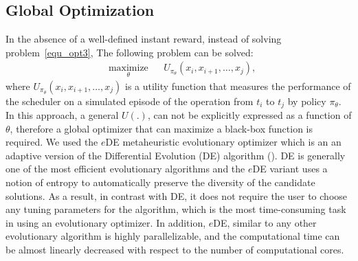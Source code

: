 \documentclass[11pt]{article}
\theoremstyle{definition}
\begin{document}
\subsection{Global Optimization}\label{sec_gopt}
In the absence of a well-defined instant reward, instead of solving problem~\ref{equ_opt3}, The following problem can be solved:
\begin{equation}%
\begin{aligned}
& \underset{\theta}{\text{maximize}}
& & U_{\pi_{\theta}}(x_i,x_{i+1}, \dots, x_{j}),
\end{aligned}
\end{equation}
where $U_{\pi_{\theta}}(x_i,x_{i+1}, \dots, x_{j})$ is a utility function that measures the performance of the scheduler on a simulated episode of the operation from $t_i$ to $t_j$ by policy $\pi_{\theta}$. In this approach, a general $U(.)$, can not be explicitly expressed as a function of $\theta$, therefore a global optimizer that can maximize a black-box function is required. We used the $e$DE metaheuristic evolutionary optimizer \cite{naghib2016entropic} which is an an adaptive version of the Differential Evolution (DE) algorithm (\cite{storn1997differential}). DE is generally one of the most efficient evolutionary algorithms and the $e$DE variant uses a notion of entropy to automatically preserve the diversity of the candidate solutions. As a result, in contrast with DE, it does not require the user to choose any tuning parameters for the algorithm, which is the most time-consuming task in using an evolutionary optimizer. In addition, $e$DE, similar to any other evolutionary algorithm is highly parallelizable, and the computational time can be almost linearly decreased with respect to the number of computational cores.  
\end{document}

